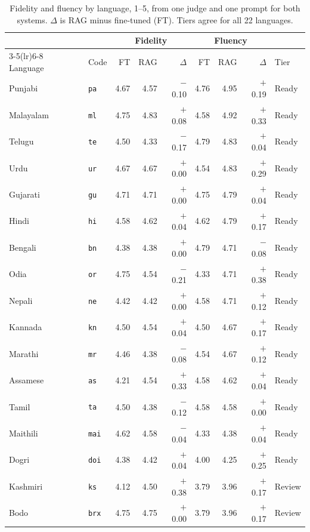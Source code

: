 \documentclass[pdflatex,sn-mathphys-num]{sn-jnl}%
\theoremstyle{thmstyleone}%
\theoremstyle{thmstyletwo}%
\theoremstyle{thmstylethree}%
\begin{document}
\begin{table}[p]
\caption{Fidelity and fluency by language, 1--5, from one judge and one prompt for both systems.
$\Delta$ is RAG minus fine-tuned (FT). Tiers agree for all 22 languages.}\label{tab:languages}
\footnotesize
\begin{tabular*}{\textwidth}{@{\extracolsep\fill}llrrrrrrl}
\toprule
& & \multicolumn{3}{c}{Fidelity} & \multicolumn{3}{c}{Fluency} & \\
\cmidrule(lr){3-5}\cmidrule(lr){6-8}
Language & Code & FT & RAG & $\Delta$ & FT & RAG & $\Delta$ & Tier \\
\midrule
Punjabi & \texttt{pa} & 4.67 & 4.57 & $-$0.10 & 4.76 & 4.95 & $+$0.19 & Ready \\
Malayalam & \texttt{ml} & 4.75 & 4.83 & $+$0.08 & 4.58 & 4.92 & $+$0.33 & Ready \\
Telugu & \texttt{te} & 4.50 & 4.33 & $-$0.17 & 4.79 & 4.83 & $+$0.04 & Ready \\
Urdu & \texttt{ur} & 4.67 & 4.67 & $+$0.00 & 4.54 & 4.83 & $+$0.29 & Ready \\
Gujarati & \texttt{gu} & 4.71 & 4.71 & $+$0.00 & 4.75 & 4.79 & $+$0.04 & Ready \\
Hindi & \texttt{hi} & 4.58 & 4.62 & $+$0.04 & 4.62 & 4.79 & $+$0.17 & Ready \\
Bengali & \texttt{bn} & 4.38 & 4.38 & $+$0.00 & 4.79 & 4.71 & $-$0.08 & Ready \\
Odia & \texttt{or} & 4.75 & 4.54 & $-$0.21 & 4.33 & 4.71 & $+$0.38 & Ready \\
Nepali & \texttt{ne} & 4.42 & 4.42 & $+$0.00 & 4.58 & 4.71 & $+$0.12 & Ready \\
Kannada & \texttt{kn} & 4.50 & 4.54 & $+$0.04 & 4.50 & 4.67 & $+$0.17 & Ready \\
Marathi & \texttt{mr} & 4.46 & 4.38 & $-$0.08 & 4.54 & 4.67 & $+$0.12 & Ready \\
Assamese & \texttt{as} & 4.21 & 4.54 & $+$0.33 & 4.58 & 4.62 & $+$0.04 & Ready \\
Tamil & \texttt{ta} & 4.50 & 4.38 & $-$0.12 & 4.58 & 4.58 & $+$0.00 & Ready \\
Maithili & \texttt{mai} & 4.62 & 4.58 & $-$0.04 & 4.33 & 4.38 & $+$0.04 & Ready \\
Dogri & \texttt{doi} & 4.38 & 4.42 & $+$0.04 & 4.00 & 4.25 & $+$0.25 & Ready \\
Kashmiri & \texttt{ks} & 4.12 & 4.50 & $+$0.38 & 3.79 & 3.96 & $+$0.17 & Review \\
Bodo & \texttt{brx} & 4.75 & 4.75 & $+$0.00 & 3.79 & 3.96 & $+$0.17 & Review \\

\end{tabular*}
\end{table}
\end{document}
